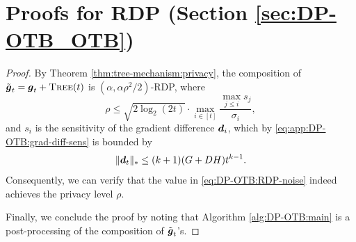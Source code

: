 \section{Proofs for RDP (Section \ref{sec:DP-OTB_OTB})}
\label{app:DP-OTB:tree-aggregation-RDP}

\ThmDpOtbPrivacy*

\begin{proof}
By Theorem \ref{thm:tree-mechanism:privacy}, the composition of $\tilde{{\boldsymbol{g}}}_t={\boldsymbol{g}}_t + {\normalfont\textsc{Tree}}(t)$ is $(\alpha,\alpha\rho^2/2)$-RDP, where
\begin{equation*}
    \rho \le \sqrt{2\log_2(2t)}\cdot \max_{i\in[t]} \frac{\max_{j\le i} s_j}{\sigma_i},
\end{equation*}
and $s_i$ is the sensitivity of the gradient difference ${\boldsymbol{d}}_i$, which by \eqref{eq:app:DP-OTB:grad-diff-sens} is bounded by 
\begin{equation*}
    \|{\boldsymbol{d}}_t\|_\ast \le (k+1)(G+DH)t^{k-1}.
\end{equation*}
Consequently, we can verify that the value in \eqref{eq:DP-OTB:RDP-noise} indeed achieves the privacy level $\rho$.

Finally, we conclude the proof by noting that Algorithm \ref{alg:DP-OTB:main} is a post-processing of the composition of $\tilde{{\boldsymbol{g}}}_t$'s.
\end{proof}
